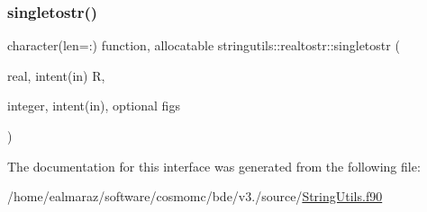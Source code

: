 \subsubsection{\texorpdfstring{singletostr()}{singletostr()}}
{\footnotesize\ttfamily character(len=\+:) function, allocatable stringutils\+::realtostr\+::singletostr (\begin{DoxyParamCaption}\item[{real, intent(in)}]{R,  }\item[{integer, intent(in), optional}]{figs }\end{DoxyParamCaption})}



The documentation for this interface was generated from the following file\+:\begin{DoxyCompactItemize}
\item 
/home/ealmaraz/software/cosmomc/bde/v3./source/\mbox{\hyperlink{StringUtils_8f90}{String\+Utils.\+f90}}\end{DoxyCompactItemize}
